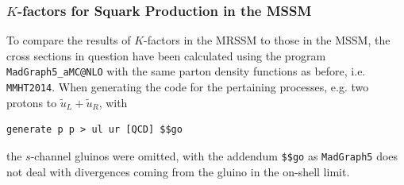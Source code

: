 \subsubsection{$K$-factors for Squark Production in the MSSM}
To compare the results of $K$-factors in the MRSSM to those in the MSSM, the cross sections in question have been calculated using the program \texttt{MadGraph5\_aMC@NLO} with the same parton density functions as before, i.e. \texttt{MMHT2014}. When generating the code for the pertaining processes, e.g. two protons to $\tilde{u}_L + \tilde{u}_R$, with
\begin{lstlisting}[style=Mybash]
generate p p > ul ur [QCD] $$go
\end{lstlisting}
the $s$-channel gluinos were omitted, with the addendum \texttt{\$\$go} as \texttt{MadGraph5} does not deal with divergences coming from the gluino in the on-shell limit. 
